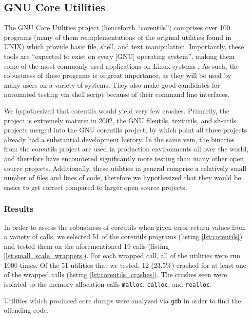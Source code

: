 \subsection{GNU Core Utilities}
The GNU Core Utilities project (henceforth ``coreutils'') comprises over 100 programs (many of them reimplementations of the original utilities found in UNIX) which provide basic file, shell, and text manipulation. Importantly, these tools are ``expected to exist on every [GNU] operating system'', making them some of the most commonly used applications on Linux systems \cite{coreutils}. As such, the robustness of these programs is of great importance, as they will be used by many users on a variety of systems. They also make good candidates for automated testing via shell script because of their command line interfaces.

We hypothesized that coreutils would yield very few crashes. Primarily, the project is extremely mature: in 2002, the GNU fileutils, textutils, and sh-utils projects merged into the GNU coreutils project, by which point all three projects already had a substantial development history. In the same vein, the binaries from the coreutils project are used in production environments all over the world, and therefore have encountered significantly more testing than many other open source projects. Additionally, these utilities in general comprise a relatively small number of files and lines of code, therefore we hypothesized that they would be easier to get correct compared to larger open source projects.

\subsubsection{Results}
In order to assess the robustness of coreutils when given error return values from a variety of calls, we selected 51 of the coreutils programs (listing \ref{lst:coreutils}) and tested them on the aforementioned 19 calls (listing \ref{lst:small_scale_wrappers}). For each wrapped call, all of the utilities were run 1000 times. Of the 51 utilities that we tested, 12 (23.5\%) crashed for at least one of the wrapped calls (listing \ref{lst:coreutils_crashes}). The crashes seen were isolated to the memory allocation calls \texttt{malloc}, \texttt{calloc}, and \texttt{realloc}. 

Utilities which produced core dumps were analyzed via \texttt{gdb} in order to find the offending code. 

\iffalse
cat ~/ReturnValueTester/test\_dir/utils.txt.bak | egrep -v '^#|^$' | cut -d "|" -f 1 | uniq | sort > utils_used.txt
ls -f -a -1 ~/Downloads/coreutils-8.25/src/*.c | rev | cut -d "/" -f 1 | rev | cut -d "." -f 1 | sort > coreutils.txt 
comm utils_used.txt coreutils.txt -12 | column -c 80
\fi

